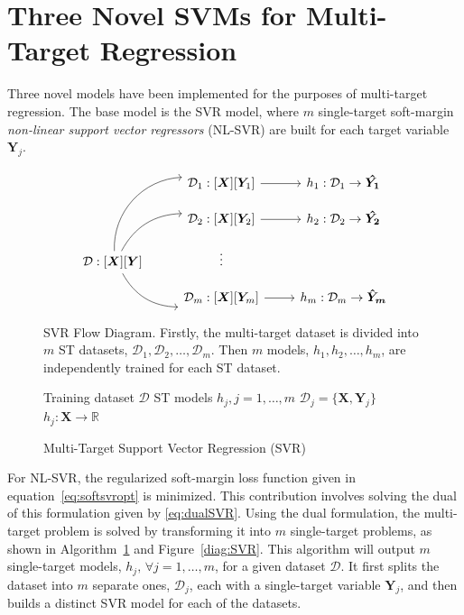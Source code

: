 \documentclass[reqno]{vcuthesis}
\numberwithin{equation}{chapter}
\begin{document}
\section{Three Novel SVMs for Multi-Target Regression}\label{sec:MTRproposal}
Three novel models have been implemented for the purposes of multi-target regression. The base model is the SVR model, where $m$ single-target soft-margin \textit{non-linear support vector regressors} (NL-SVR) are built for each target variable $\bm Y_j$. 
\begin{figure}[b!]
\begin{minipage}{0.9\textwidth}
\small \centering
\[\begin{tikzcd}[column sep = small, row sep = small]
& & \mathcal{D}_1 :  [\bm X][\bm Y_1]  \arrow[rr]  & & h_1 :  \mathcal{D}_1 \rightarrow \bm{\hat{Y_1}}\\
& & \mathcal{D}_2 :  [\bm X][\bm Y_2]  \arrow[rr] & & h_2 :  \mathcal{D}_2 \rightarrow \bm{\hat{Y_2}} \\        
\mathcal{D} :  [\bm X][\bm Y]  \arrow[uurr, bend left=45] \arrow[urr, bend left] \arrow[drr, bend right]  		& & \vdots \\
& & \mathcal{D}_m :  [\bm X][\bm Y_m] \arrow[rr] & & h_m :  \mathcal{D}_m \rightarrow \bm{\hat{Y}_m}
\end{tikzcd}\]
\end{minipage}
\caption{\small SVR Flow Diagram. Firstly, the multi-target dataset is divided into $m$ ST datasets, $\mathcal{D}_1, \mathcal{D}_2, \ldots, \mathcal{D}_m$. Then $m$ models, $h_1, h_2, \ldots, h_m$, are independently trained for each ST dataset.}\label{diag:SVR}
\begin{algorithm}[H]
\caption{Multi-Target Support Vector Regression (SVR)} \label{alg:SVR} 
\small \centering
\begin{algorithmic}[1]
\renewcommand{\algorithmicrequire}{\textbf{Input:}}
\renewcommand{\algorithmicensure}{\textbf{Output:}}
\Require Training dataset $\mathcal{D}$
\Ensure  ST models $h_j, j = 1,\ldots,m$
\State $\mathcal{D}_j = \{\bm X, \bm Y_j\}$ 
\State $h_j : \bm X \rightarrow \mathbb{R}$ 
\EndFor 
\end{algorithmic} 
\end{algorithm}
\end{figure}

For NL-SVR, the regularized soft-margin loss function given in equation~\eqref{eq:softsvropt} is minimized. This contribution involves solving the dual of this formulation given by \eqref{eq:dualSVR}. Using the dual formulation, the multi-target problem is solved by transforming it into $m$ single-target problems, as shown in Algorithm~\ref{alg:SVR} and Figure~\ref{diag:SVR}. This algorithm will output $m$ single-target models, $h_j,\,\forall j = 1,\ldots,m$, for a given dataset $\mathcal{D}$. It first splits the dataset into $m$ separate ones, $\mathcal{D}_j$, each with a single-target variable $\bm Y_j$, and then builds a distinct SVR model for each of the datasets. 
\end{document}
